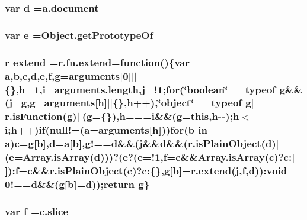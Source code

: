 \subsubsection[{\texorpdfstring{d}{d}}]{\setlength{\rightskip}{0pt plus 5cm}var d =a.\+document}\hypertarget{jquery-3_8js_aeb337d295abaddb5ec3cb34cc2e2bbc9}{}\label{jquery-3_8js_aeb337d295abaddb5ec3cb34cc2e2bbc9}
\subsubsection[{\texorpdfstring{e}{e}}]{\setlength{\rightskip}{0pt plus 5cm}var e =Object.\+get\+Prototype\+Of}\hypertarget{jquery-3_8js_ab5902775854a8b8440bcd25e0fe1c120}{}\label{jquery-3_8js_ab5902775854a8b8440bcd25e0fe1c120}
\subsubsection[{\texorpdfstring{extend}{extend}}]{ {\bf r} extend =r.\+fn.\+extend=function()\{var {\bf a},{\bf b},{\bf c},{\bf d},{\bf e},{\bf f},{\bf g}=arguments\mbox{[}0\mbox{]}$\vert$$\vert$\{\},{\bf h}=1,{\bf i}=arguments.\+length,{\bf j}=!1;for(\char`\"{}boolean\char`\"{}==typeof {\bf g}\&\&({\bf j}={\bf g},{\bf g}=arguments\mbox{[}{\bf h}\mbox{]}$\vert$$\vert$\{\},{\bf h}++),\char`\"{}object\char`\"{}==typeof {\bf g}$\vert$$\vert$r.\+is\+Function({\bf g})$\vert$$\vert$({\bf g}=\{\}),{\bf h}==={\bf i}\&\&({\bf g}={\bf this},{\bf h}-\/-\/);{\bf h}$<${\bf i};{\bf h}++)if(null!=({\bf a}=arguments\mbox{[}{\bf h}\mbox{]}))for({\bf b} in {\bf a}){\bf c}={\bf g}\mbox{[}{\bf b}\mbox{]},{\bf d}={\bf a}\mbox{[}{\bf b}\mbox{]},g!=={\bf d}\&\&({\bf j}\&\&{\bf d}\&\&(r.\+is\+Plain\+Object({\bf d})$\vert$$\vert$({\bf e}=Array.\+is\+Array({\bf d})))?({\bf e}?({\bf e}=!1,{\bf f}={\bf c}\&\&Array.\+is\+Array({\bf c})?c\+:\mbox{[}$\,$\mbox{]})\+:{\bf f}={\bf c}\&\&r.\+is\+Plain\+Object({\bf c})?c\+:\{\},{\bf g}\mbox{[}{\bf b}\mbox{]}=r.\+extend({\bf j},{\bf f},{\bf d}))\+:void 0!=={\bf d}\&\&({\bf g}\mbox{[}{\bf b}\mbox{]}={\bf d}));return {\bf g}\}}\hypertarget{jquery-3_8js_a8a9982f7c9b3cf8d7e33c6e220d1e1ec}{}\label{jquery-3_8js_a8a9982f7c9b3cf8d7e33c6e220d1e1ec}
\subsubsection[{\texorpdfstring{f}{f}}]{\setlength{\rightskip}{0pt plus 5cm}var f =c.\+slice}\hypertarget{jquery-3_8js_a9cf09a2972472098a4c689fd988f4dfc}{}\label{jquery-3_8js_a9cf09a2972472098a4c689fd988f4dfc}
